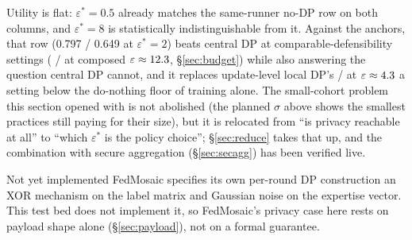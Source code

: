 Utility is flat: $\varepsilon^{*} = 0.5$ already matches the same-runner no-DP row on both columns,
and $\varepsilon^{*} = 8$ is statistically indistinguishable from it. Against the anchors, that
row (0.797 / 0.649 at $\varepsilon^{*} = 2$) beats central DP at comparable-defensibility settings
(\AUCAtSigmaTwo{} / \WorstAtSigmaTwo{} at composed $\varepsilon \approx 12.3$,
\S\ref{sec:budget}) while also
answering the question central DP cannot, and it replaces update-level local DP's
\LocalAUCOne{} / \LocalWorstOne{} at
$\varepsilon \approx 4.3{}$ a setting below the do-nothing floor of training alone. The
small-cohort problem this section opened with is not abolished (the planned $\sigma$ above shows the
smallest practices still paying for their size), but it is relocated from ``is privacy reachable at
all'' to ``which $\varepsilon^{*}$ is the policy choice''; \S\ref{sec:reduce} takes that up, and the
combination with secure aggregation (\S\ref{sec:secagg}) has been verified live.

\begin{sidenote}{Not yet implemented}
FedMosaic specifies its own per-round DP construction an XOR mechanism on the label matrix and
Gaussian noise on the expertise vector. This test bed does not implement it, so FedMosaic's privacy
case here rests on payload shape alone (\S\ref{sec:payload}), not on a formal guarantee.
\end{sidenote}
